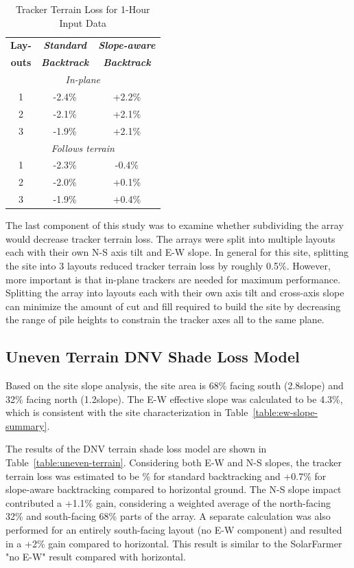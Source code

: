 \documentclass[conference]{IEEEtran}
\begin{document}
\begin{table}[htbp]
\caption{Tracker Terrain Loss for 1-Hour Input Data}
\begin{center}
\begin{tabular}{|c|c|c|}
\hline
\textbf{Lay-}& \textbf{\textit{Standard}}& \textbf{\textit{Slope-aware}}\\
\textbf{outs}& \textbf{\textit{Backtrack}}&    \textbf{\textit{Backtrack}} \\
\hline
\multicolumn{3}{|c|}{\textit{In-plane}} \\
\hline
1& -2.4\% & +2.2\%  \\
\hline
2& -2.1\% & +2.1\%  \\
\hline
3& -1.9\% & +2.1\%  \\
\hline
\multicolumn{3}{|c|}{\textit{Follows terrain}} \\
\hline
1& -2.3\% & -0.4\%  \\
\hline
2& -2.0\% & +0.1\%  \\
\hline
3& -1.9\% & +0.4\%  \\
\hline
\end{tabular}
\label{table:terrain-loss-1hr}
\end{center}
\end{table}

The last component of this study was to examine whether subdividing the array would decrease tracker terrain loss. The arrays were split into multiple layouts each with their own N-S axis tilt and E-W slope. In general for this site, splitting the site into 3 layouts reduced tracker terrain loss by roughly 0.5\%. However, more important is that in-plane trackers are needed for maximum performance. Splitting the array into layouts each with their own axis tilt and cross-axis slope can minimize the amount of cut and fill required to build the site by decreasing the range of pile heights to constrain the tracker axes all to the same plane.

\subsection{Uneven Terrain DNV Shade Loss Model}
Based on the site slope analysis, the site area is 68\% facing south (2.8\degree  slope) and 32\% facing north (1.2\degree  slope). The E-W effective slope was calculated to be 4.3\%, which is consistent with the site characterization in Table~\ref{table:ew-slope-summary}. 

The results of the DNV terrain shade loss model are shown in Table~\ref{table:uneven-terrain}. Considering both E-W and N-S slopes, the tracker terrain loss was estimated to be \% for standard backtracking and +0.7\% for slope-aware backtracking compared to horizontal ground. The N-S slope impact contributed a +1.1\% gain, considering a weighted average of the north-facing 32\% and south-facing 68\% parts of the array. A separate calculation was also performed for an entirely south-facing layout (no E-W component) and resulted in a +2\% gain compared to horizontal. This result is similar to the SolarFarmer "no E-W" result compared with horizontal.    
\end{document}
